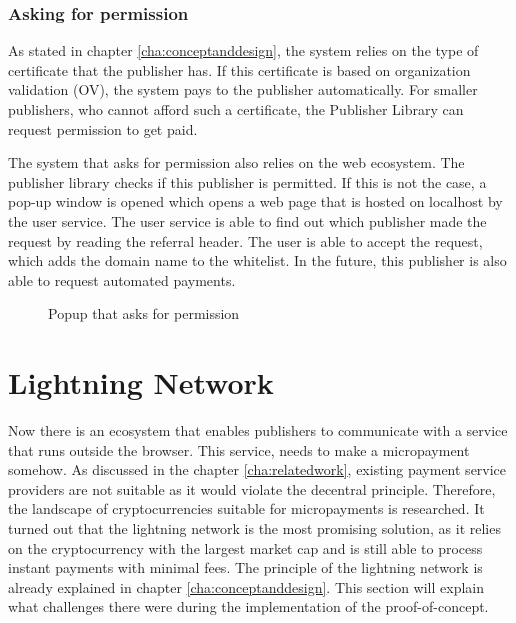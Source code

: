 \subsubsection{Asking for permission}
As stated in chapter \ref{cha:conceptanddesign}, the system relies on the type of certificate that the publisher has. If this certificate is based on organization validation (OV), the system pays to the publisher automatically. For smaller publishers, who cannot afford such a certificate, the Publisher Library can request permission to get paid. 

The system that asks for permission also relies on the web ecosystem. The publisher library checks if this publisher is permitted. If this is not the case, a pop-up window is opened which opens a web page that is hosted on localhost by the user service. The user service is able to find out which publisher made the request by reading the referral header. The user is able to accept the request, which adds the domain name to the whitelist. In the future, this publisher is also able to request automated payments.

\begin{figure}[h!]
  \setlength{\fboxsep}{0pt}%
  \caption{Popup that asks for permission}
\end{figure}

\section{Lightning Network}

Now there is an ecosystem that enables publishers to communicate with a service that runs outside the browser. This service, needs to make a micropayment somehow. As discussed in the chapter \ref{cha:relatedwork}, existing payment service providers are not suitable as it would violate the decentral principle. Therefore, the landscape of cryptocurrencies suitable for micropayments is researched. It turned out that the lightning network is the most promising solution, as it relies on the cryptocurrency with the largest market cap and is still able to process instant payments with minimal fees. The principle of the lightning network is already explained in chapter \ref{cha:conceptanddesign}. This section will explain what challenges there were during the implementation of the proof-of-concept.


